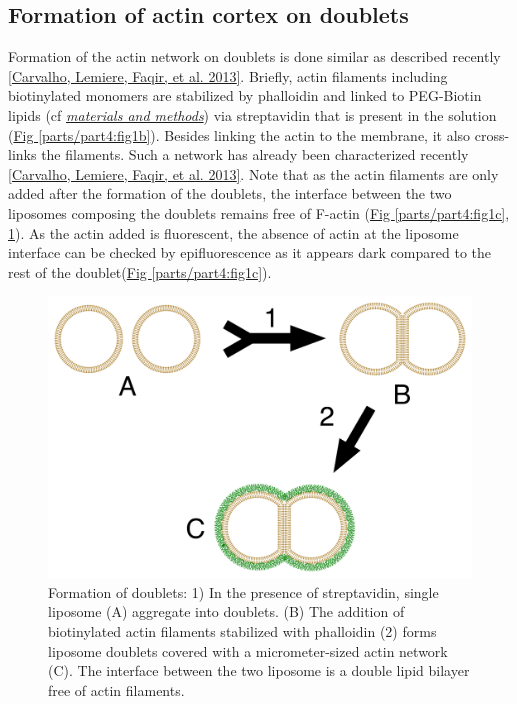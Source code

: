 \documentclass[A4paperpaper,11pt,english]{sphinxmanual}
\begin{document}
\subsection{Formation of actin cortex on doublets}
\label{parts/part4:formation-of-actin-cortex-on-doublets}
Formation of the actin network on doublets is done similar as described
recently {\hyperref[parts/part4:carvalho2013a]{{[}Carvalho, Lemiere, Faqir,  et al.  2013{]}}}.  Briefly, actin filaments including
biotinylated monomers are stabilized by phalloidin and linked to PEG-Biotin
lipids (cf {\hyperref[parts/part2:m-et-m]{\emph{materials and methods}}})  via streptavidin that is
present in the solution (\hyperref[parts/part4:fig1b]{Fig  \ref*{parts/part4:fig1b}}).  Besides linking the actin to the
membrane, it also cross-links the filaments.  Such a network has already been
characterized recently {\hyperref[parts/part4:carvalho2013a]{{[}Carvalho, Lemiere, Faqir,  et al.  2013{]}}}.  Note that as the actin filaments
are only added after the formation of the doublets, the interface between the
two liposomes composing the doublets remains free of F-actin (\hyperref[parts/part4:fig1c]{Fig  \ref*{parts/part4:fig1c}}, \hyperref[parts/part4:fds]{ \ref*{parts/part4:fds}}). As the actin added is fluorescent, the absence of actin
at the liposome interface can be checked by epifluorescence as it appears dark
compared to the rest of the doublet(\hyperref[parts/part4:fig1c]{Fig  \ref*{parts/part4:fig1c}}).
\begin{figure}[htbp]
\centering
\capstart

\includegraphics[width=0.700\linewidth]{doublets-schema.png}
\caption{Formation of doublets: 1) In the presence of streptavidin, single liposome
(A) aggregate into doublets. (B) The addition of biotinylated actin
filaments stabilized with phalloidin (2) forms liposome doublets covered
with a micrometer-sized actin network (C). The interface between the two
liposome is a double lipid bilayer free of actin filaments.}\label{parts/part4:fds}\end{figure}
\end{document}

